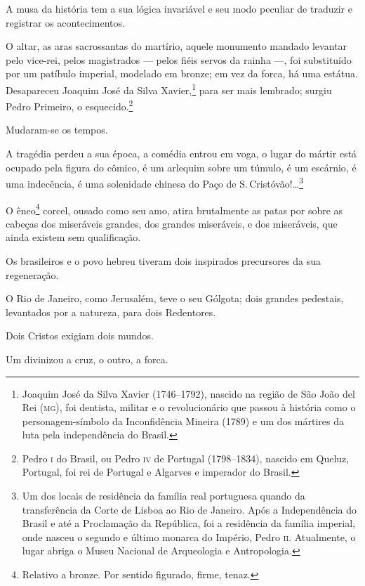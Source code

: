 {\noindent\dotfill{}

A musa da história tem a sua lógica invariável e seu modo peculiar de
traduzir e registrar os acontecimentos.

O altar, as aras sacrossantas do martírio, aquele monumento mandado
levantar pelo vice-rei, pelos magistrados --- pelos fiéis servos da
rainha ---, foi substituído por um patíbulo imperial, modelado em
bronze; em vez da forca, há uma estátua. Desapareceu Joaquim José da
Silva Xavier,\footnote{Joaquim José da Silva Xavier (1746--1792),
  nascido na região de São João del Rei (\textsc{mg}), foi dentista, militar e o
  revolucionário que passou à história como o personagem-símbolo da
  Inconfidência Mineira (1789) e um dos mártires da luta pela
  independência do Brasil.} para ser mais lembrado; surgiu Pedro
Primeiro, o esquecido.\footnote{Pedro \textsc{i} do Brasil, ou Pedro \textsc{iv} de
  Portugal (1798--1834), nascido em Queluz, Portugal, foi rei de Portugal
  e Algarves e imperador do Brasil.}

Mudaram-se os tempos.

A tragédia perdeu a sua época, a comédia entrou em voga, o lugar do
mártir está ocupado pela figura do cômico, é um arlequim sobre um
túmulo, é um escárnio, é uma indecência, é uma solenidade chinesa do
Paço de S.\,Cristóvão!\ldots{}\footnote{Um dos locais de residência
  da família real portuguesa quando da transferência da
  Corte de Lisboa ao Rio de Janeiro. Após a Independência do Brasil e até a Proclamação da República, foi a residência da família
  imperial, onde nasceu o segundo e último monarca do
  Império, Pedro \textsc{ii}. Atualmente, o lugar abriga o Museu Nacional de
  Arqueologia e Antropologia.}

O êneo\footnote{Relativo a bronze. Por sentido figurado, firme, tenaz.}
corcel, ousado como seu amo, atira brutalmente as patas por sobre as
cabeças dos miseráveis grandes, dos grandes miseráveis, e dos
miseráveis, que ainda existem sem qualificação.

Os brasileiros e o povo hebreu tiveram dois inspirados precursores da
sua regeneração.

O Rio de Janeiro, como Jerusalém, teve o seu Gólgota; dois grandes
pedestais, levantados por a natureza, para dois Redentores.

Dois Cristos exigiam dois mundos.

Um divinizou a cruz, o outro, a forca.

}
